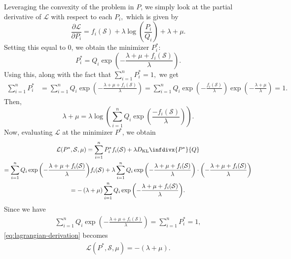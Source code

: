 \documentclass[letter,11pt]{article}
\newcommand{\infdiv}{D_{\text{KL}}\infdivx}
\def\lp{\left(}
\def\rp{\right)}
\def\sS{\mathcal{S}}
\begin{document}
Leveraging the convexity of the problem in $P$, we simply look at the partial derivative of $\mathcal{L}$ with respect to each $P_i,$ which is given by
\begin{equation}\label{eq:optimalP}
\frac{\partial\mathcal{L}}{\partial P_i} = f_i(\sS) + \lambda \log \lp \frac{P_i}{Q_i} \rp + \lambda + \mu.
\end{equation}
Setting this equal to $0$, we obtain the minimizer $P_i^*$:
\begin{equation}\label{eq:pstar}
P_i^* = Q_i\exp{\lp-\frac{\lambda+\mu+f_i(\sS)}{\lambda}\rp}.
\end{equation}
Using this, along with the fact that $\sum_{i=1}^n P_i^* = 1,$ we get
\begin{equation}
\begin{split}
\sum_{i=1}^n P_i^* &= \sum_{i=1}^n Q_i\exp{\lp-\frac{\lambda+\mu+f_i(\sS)}{\lambda}\rp} = \sum_{i=1}^n Q_i\exp{\lp - \frac{f_i(\sS)}{\lambda}\rp}\exp{\lp-\frac{\lambda+\mu}{\lambda}\rp}=1.
\end{split}
\end{equation}
Then,
\begin{equation}\label{eq:lambda-plus-mu}
\lambda+\mu= \lambda\log\lp\sum_{i=1}^nQ_i\exp{\lp\frac{-f_i(\sS)}{\lambda}\rp}\rp.
\end{equation}
Now, evaluating $\mathcal{L}$ at the minimizer $P^*$, we obtain
\begin{equation}\label{eq:lagrangian-derivation}
\begin{gathered}
\mathcal{L}(P^*, \sS, \mu) = \sum_{i=1}^n P_i^* f_i(\sS) + \lambda \infdiv{P^*}{Q} \\
= \sum_{i=1}^n Q_i\exp{\lp-\frac{\lambda+\mu+f_i(\sS)}{\lambda}\rp}f_i(\sS) + \lambda \sum_{i=1}^n Q_i\exp{\lp-\frac{\lambda+\mu+f_i(\sS)}{\lambda}\rp} \cdot \lp-\frac{\lambda+\mu+f_i(\sS)}{\lambda}\rp \\
= -\lp\lambda+\mu \rp \sum_{i=1}^n Q_i\exp{\lp-\frac{\lambda+\mu+f_i(\sS)}{\lambda}\rp}. \\
\end{gathered}
\end{equation}
Since we have
\begin{equation}
\begin{split}
\sum_{i=1}^n Q_i\exp{\lp-\frac{\lambda+\mu+f_i(\sS)}{\lambda}\rp} = \sum_{i=1}^n P_i^*=1,
\end{split}
\end{equation}
\eqref{eq:lagrangian-derivation} becomes
\begin{equation}
\begin{split}
\mathcal{L}(P^*, \sS, \mu) = -\lp\lambda + \mu\rp.
\end{split}
\end{equation}
\end{document}
